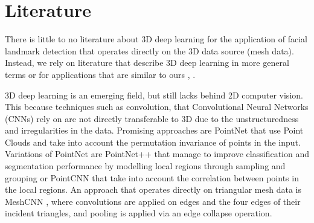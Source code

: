 \documentclass{article}
\begin{document}

\section{Literature}
There is little to no literature about 3D deep learning for the application of facial landmark detection that operates directly on the 3D data source (mesh data). Instead, we rely on literature that describe 3D deep learning in more general terms or for applications that are similar to ours \cite{Guo2020}, \cite{Bello2020}.

3D deep learning is an emerging field, but still lacks behind 2D computer vision. This because techniques such as convolution, that Convolutional Neural Networks (CNNs) rely on are not directly transferable to 3D due to the unstructuredness and irregularities in the data. Promising approaches are PointNet \cite{Qi2017} that use Point Clouds and take into account the permutation invariance of points in the input. Variations of PointNet are PointNet++ \cite{Qi2017b} that manage to improve classification and segmentation performance by modelling local regions through sampling and grouping or PointCNN \cite{Li2018} that take into account the  correlation between points in the local regions.
An approach that operates directly on triangular mesh data is MeshCNN \cite{Hanocka2019}, where convolutions are applied on edges and the four edges of their incident triangles, and pooling is applied via an edge collapse operation.
\end{document}

